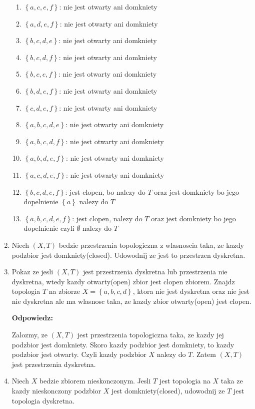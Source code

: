 \documentclass{article}
\begin{document}
\begin{enumerate}
\begin{enumerate}[label=\arabic*.]
\item $\left\{ a,c,e,f \right\}$: nie jest otwarty ani domkniety
\item $\left\{ a,d,e,f \right\}$: nie jest otwarty ani domkniety
\item $\left\{ b,c,d,e \right\}$: nie jest otwarty ani domkniety
\item $\left\{ b,c,d,f \right\}$: nie jest otwarty ani domkniety
\item $\left\{ b,c,e,f \right\}$: nie jest otwarty ani domkniety
\item $\left\{ b,d,e,f \right\}$: nie jest otwarty ani domkniety
\item $\left\{ c,d,e,f \right\}$: nie jest otwarty ani domkniety
\item $\left\{ a,b,c,d,e \right\}$: nie jest otwarty ani domkniety
\item $\left\{ a,b,c,d,f \right\}$: nie jest otwarty ani domkniety
\item $\left\{ a,b,d,e,f \right\}$: nie jest otwarty ani domkniety
\item $\left\{ a,c,d,e,f \right\}$: nie jest otwarty ani domkniety
\item $\left\{ b,c,d,e,f \right\}$: jest clopen, bo nalezy do $T$ oraz jest domkniety bo jego dopelnienie $\left\{ a \right\}$ nalezy do $T$
\item $\left\{ a,b,c,d,e,f \right\}$: jest clopen, nalezy do $T$ oraz jest domkniety bo jego dopelnienie czyli $\emptyset$ nalezy do $T$

\end{enumerate} %
\item Niech $(X,T)$ bedzie przestrzenia topologiczna z wlasnoscia taka, ze kazdy podzbior jest domkniety(closed). Udowodnij ze jest to przestrzen dyskretna.
\item Pokaz ze jesli $(X,T)$ jest przestrzenia dyskretna lub przestrzenia nie dyskretna, wtedy kazdy otwarty(open) zbior jest clopen zbiorem. Znajdz topologia $T$ na zbiorze $X = \left\{ a,b,c,d \right\}$, ktora nie jest dyskretna oraz nie jest nie dyskretna ale ma wlasnosc taka, ze kazdy zbior otwarty(open) jest clopen.

\textbf{Odpowiedz:}

Zalozmy, ze $(X,T)$ jest przestrzenia topologiczna taka, ze kazdy jej podzbior jest domkniety. Skoro kazdy podzbior jest domkniety, to kazdy podzbior jest otwarty. Czyli kazdy podzbior $X$ nalezy do $T$. Zatem $(X,T)$ jest przestrzenia dyskretna. 
\item Niech $X$ bedzie zbiorem nieskonczonym. Jesli $T$ jest topologia na $X$ taka ze kazdy nieskonczony podzbior $X$ jest domkniety(closed), udowodnij ze $T$ jest topologia dyskretna.
 

\end{enumerate}
\end{document}
